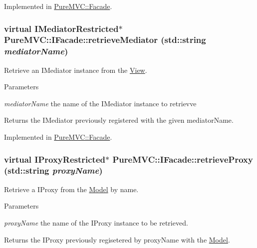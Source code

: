 Implemented in \hyperlink{class_pure_m_v_c_1_1_facade_a2cca0e7a4b11e905c2d4f5d7e0a545c1}{PureMVC::Facade}.\hypertarget{class_pure_m_v_c_1_1_i_facade_aa253e28220cf0f077ac212d0acf7652d}{
\subsubsection[{retrieveMediator}]{\setlength{\rightskip}{0pt plus 5cm}virtual {\bf IMediatorRestricted}$\ast$ PureMVC::IFacade::retrieveMediator (std::string {\em mediatorName})}}
\label{class_pure_m_v_c_1_1_i_facade_aa253e28220cf0f077ac212d0acf7652d}


Retrieve an {\ttfamily IMediator} instance from the {\ttfamily \hyperlink{class_pure_m_v_c_1_1_view}{View}}. 
\begin{DoxyParams}{Parameters}
\item[{\em mediatorName}]the name of the {\ttfamily IMediator} instance to retrievve \end{DoxyParams}
\begin{DoxyReturn}{Returns}
the {\ttfamily IMediator} previously registered with the given {\ttfamily mediatorName}. 
\end{DoxyReturn}


Implemented in \hyperlink{class_pure_m_v_c_1_1_facade_a4e821a5fcc6c2fa509742e88ca43dd2d}{PureMVC::Facade}.\hypertarget{class_pure_m_v_c_1_1_i_facade_a0af423a85df80b52acd106c5adf07318}{
\subsubsection[{retrieveProxy}]{\setlength{\rightskip}{0pt plus 5cm}virtual {\bf IProxyRestricted}$\ast$ PureMVC::IFacade::retrieveProxy (std::string {\em proxyName})}}
\label{class_pure_m_v_c_1_1_i_facade_a0af423a85df80b52acd106c5adf07318}


Retrieve a {\ttfamily IProxy} from the {\ttfamily \hyperlink{class_pure_m_v_c_1_1_model}{Model}} by name. 
\begin{DoxyParams}{Parameters}
\item[{\em proxyName}]the name of the {\ttfamily IProxy} instance to be retrieved. \end{DoxyParams}
\begin{DoxyReturn}{Returns}
the {\ttfamily IProxy} previously regisetered by {\ttfamily proxyName} with the {\ttfamily \hyperlink{class_pure_m_v_c_1_1_model}{Model}}. 
\end{DoxyReturn}


